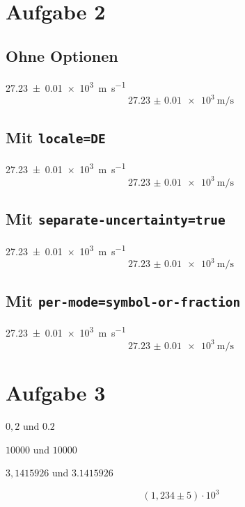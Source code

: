 \documentclass{scrartcl}
\begin{document}
\section*{Aufgabe 2}
\subsection*{Ohne Optionen}
\SI{27.23(1)e3}{\meter\per\second}
\begin{equation}
  \SI{27.23(1)e3}{\meter\per\second} 
\end{equation}

\subsection*{Mit \texttt{locale=DE}}
\SI{27.23(1)e3}{\meter\per\second}
\begin{equation}
  \SI{27.23(1)e3}{\meter\per\second} 
\end{equation}

\subsection*{Mit \texttt{separate-uncertainty=true}}
\SI{27.23(1)e3}{\meter\per\second}
\begin{equation}
  \SI{27.23(1)e3}{\meter\per\second} 
\end{equation}

\subsection*{Mit \texttt{per-mode=symbol-or-fraction}}
\SI{27.23(1)e3}{\meter\per\second}
\begin{equation} 
  \SI{27.23(1)e3}{\meter\per\second} 
\end{equation}

\section*{Aufgabe 3}
$0,2$ und $\num{0,2}$

$10000$ und $\num{10000}$

$3,1415926$ und $\num{3,1415926}$

\begin{equation}
  (1,\!234 \pm 5)\cdot 10^3
\end{equation}
\end{document}
